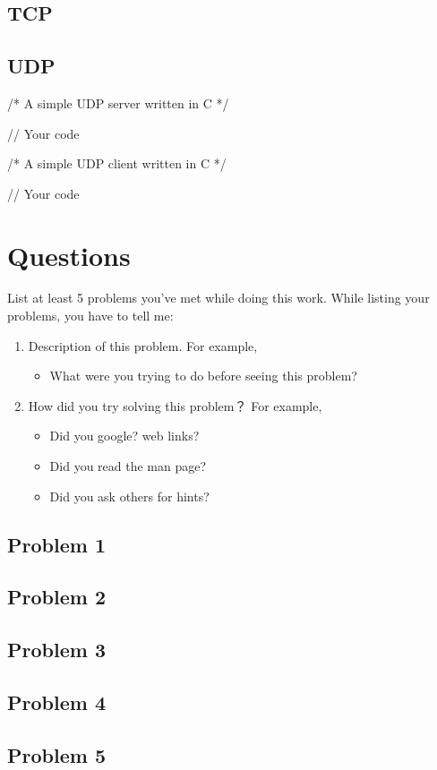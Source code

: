 \documentclass{swfulabreport}
\begin{document}
\subsection{TCP}

\begin{longlisting}
  \caption{A simple TCP server}
\end{longlisting}

\begin{longlisting}
  \caption{A simple TCP client}
\end{longlisting}

\subsection{UDP}

\begin{ccode}
/* A simple UDP server written in C */

// Your code
\end{ccode}

\begin{ccode}
/* A simple UDP client written in C */

// Your code
\end{ccode}

\section{Questions}

List at least 5 problems you've met while doing this work. While
listing your problems, you have to tell me:
\begin{enumerate}
\item Description of this problem. For example,
  \begin{itemize}
  \item What were you trying to do before seeing this problem?
  \end{itemize}
\item How did you try solving this problem？ For example,
  \begin{itemize}
  \item Did you google? web links?
  \item Did you read the man page?
  \item Did you ask others for hints?
  \end{itemize}
\end{enumerate}

\subsection{Problem 1}

\subsection{Problem 2}

\subsection{Problem 3}

\subsection{Problem 4}

\subsection{Problem 5}
\end{document}
